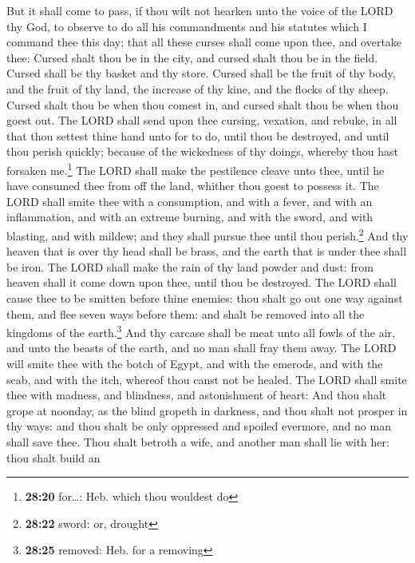  But it shall come to pass, if thou wilt not hearken unto
the voice of the LORD thy God, to observe to do all his commandments and
his statutes which I command thee this day; that all these curses shall
come upon thee, and overtake thee:  Cursed shalt thou be
in the city, and cursed shalt thou be in the field. 
Cursed shall be thy basket and thy store.  Cursed shall
be the fruit of thy body, and the fruit of thy land, the increase of thy
kine, and the flocks of thy sheep.  Cursed shalt thou be
when thou comest in, and cursed shalt thou be when thou goest out.
 The LORD shall send upon thee cursing, vexation, and
rebuke, in all that thou settest thine hand unto for to do, until thou
be destroyed, and until thou perish quickly; because of the wickedness
of thy doings, whereby thou hast forsaken me.\footnote{\textbf{28:20}
  for\ldots: Heb. which thou wouldest do}  The LORD shall
make the pestilence cleave unto thee, until he have consumed thee from
off the land, whither thou goest to possess it.  The LORD
shall smite thee with a consumption, and with a fever, and with an
inflammation, and with an extreme burning, and with the sword, and with
blasting, and with mildew; and they shall pursue thee until thou
perish.\footnote{\textbf{28:22} sword: or, drought}  And
thy heaven that is over thy head shall be brass, and the earth that is
under thee shall be iron.  The LORD shall make the rain
of thy land powder and dust: from heaven shall it come down upon thee,
until thou be destroyed.  The LORD shall cause thee to be
smitten before thine enemies: thou shalt go out one way against them,
and flee seven ways before them: and shalt be removed into all the
kingdoms of the earth.\footnote{\textbf{28:25} removed: Heb. for a
  removing}  And thy carcase shall be meat unto all fowls
of the air, and unto the beasts of the earth, and no man shall fray them
away.  The LORD will smite thee with the botch of Egypt,
and with the emerods, and with the scab, and with the itch, whereof thou
canst not be healed.  The LORD shall smite thee with
madness, and blindness, and astonishment of heart:  And
thou shalt grope at noonday, as the blind gropeth in darkness, and thou
shalt not prosper in thy ways: and thou shalt be only oppressed and
spoiled evermore, and no man shall save thee.  Thou shalt
betroth a wife, and another man shall lie with her: thou shalt build an
